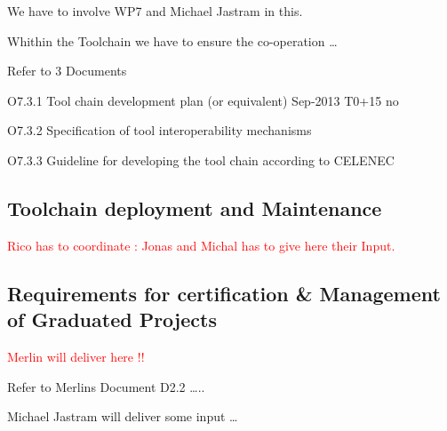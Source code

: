 \documentclass{template/openetcs_article}
\begin{document}
We have to involve WP7 and Michael Jastram in this.

Whithin the Toolchain we have to ensure the co-operation {\dots} 

Refer to 3 Documents

O7.3.1 Tool chain development plan (or equivalent) Sep-2013 T0+15 no

O7.3.2 Specification of tool interoperability mechanisms

O7.3.3 Guideline for developing the tool chain according to CELENEC



\subsection[Toolchain deployment and Maintenance]{Toolchain deployment and Maintenance}
\textcolor{red}{Rico has to coordinate : Jonas and Michal has to give here their Input.}


\subsection{Requirements for certification \& Management of Graduated Projects}
\textcolor{red}{Merlin will deliver here !!}

Refer to Merlins Document D2.2 {\dots}..

Michael Jastram will deliver some input {\dots}
\end{document}
